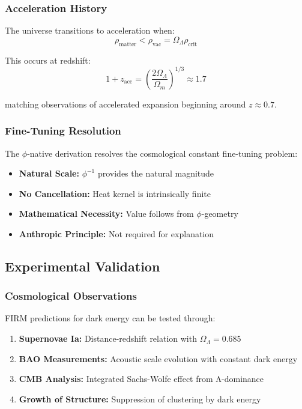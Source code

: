 \subsubsection{Acceleration History}

The universe transitions to acceleration when:
\begin{equation}
\rho_{\text{matter}} < \rho_{\text{vac}} = \Omega_\Lambda \rho_{\text{crit}}
\end{equation}

This occurs at redshift:
\begin{equation}
1 + z_{\text{acc}} = \left(\frac{2\Omega_\Lambda}{\Omega_m}\right)^{1/3} \approx 1.7
\end{equation}

matching observations of accelerated expansion beginning around $z \approx 0.7$.

\subsubsection{Fine-Tuning Resolution}

The $\phi$-native derivation resolves the cosmological constant fine-tuning problem:
\begin{itemize}
\item \textbf{Natural Scale:} $\phi^{-1}$ provides the natural magnitude
\item \textbf{No Cancellation:} Heat kernel is intrinsically finite
\item \textbf{Mathematical Necessity:} Value follows from $\phi$-geometry
\item \textbf{Anthropic Principle:} Not required for explanation
\end{itemize}

\subsection{Experimental Validation}

\subsubsection{Cosmological Observations}

FIRM predictions for dark energy can be tested through:
\begin{enumerate}
\item \textbf{Supernovae Ia:} Distance-redshift relation with $\Omega_\Lambda = 0.685$
\item \textbf{BAO Measurements:} Acoustic scale evolution with constant dark energy
\item \textbf{CMB Analysis:} Integrated Sachs-Wolfe effect from Λ-dominance
\item \textbf{Growth of Structure:} Suppression of clustering by dark energy
\end{enumerate}


